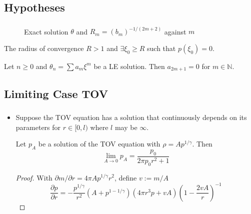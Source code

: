 \subsection{Hypotheses}
\begin{frame}
	\frametitle{\insertsubsection}
	\begin{figure}
		\caption{Exact solution $\theta$ and $R_m=(b_m)^{-1/(2m+2)}$ against $m$}
	\end{figure}
	\pause
	\begin{hypothesis}
		The radius of convergence $R>1$ and $\exists\xi_0\geq R$ such that $p(\xi_0)=0$.
	\end{hypothesis}
	\pause
	\begin{hypothesis}
		Let  $n\geq0$ and $\theta_n=\sum a_m\xi^m$ be a LE solution. Then $a_{2m+1}=0$ for $m\in\mathbb{N}$.
	\end{hypothesis}
\end{frame}


\subsection{Limiting Case TOV}
\begin{frame}
	\frametitle{\insertsubsection}
	\begin{itemize}[<+->]
		\item Suppose the TOV equation has a solution that continuously depends on its parameters for $r\in[0,l)$ where $l$ may be $\infty$.
		\begin{theorem}
			Let $p_A$ be a solution of the TOV equation with $\rho=Ap^{1/\gamma}$. Then 
			\begin{equation}
				\lim_{A\rightarrow0}p_A=\frac{p_0}{2\pi p_0r^2+1}
			\end{equation}
		\end{theorem}
		\begin{proof}
			With $\partial m/\partial r = 4\pi Ap^{1/\gamma}r^2$, define $v:=m/A$
			\begin{equation}
				\frac{\partial p}{\partial r} = -\frac{p^{1/\gamma}}{r^2}\left(A+p^{1-1/\gamma}\right)\left(4\pi r^3p+vA\right)\left(1-\frac{2vA}{r}\right)^{-1}
			\end{equation}
		\end{proof}
	\end{itemize}
\end{frame}

